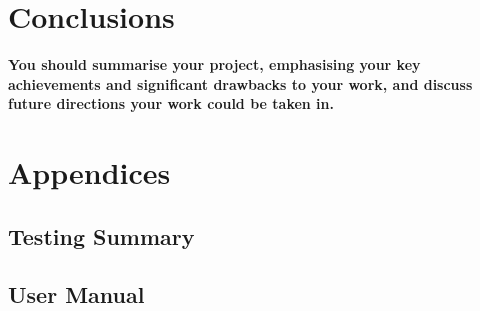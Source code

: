 \documentclass{article}
\begin{document}
\section{Conclusions}
\textbf{You should summarise your project, emphasising your
key achievements and significant drawbacks to your
work, and discuss future directions your work could be
taken in.}
\newpage
\cite{Agarwal2012} %


\newpage
\section*{Appendices}
\subsection*{Testing Summary}
\subsection*{User Manual}
\end{document}
